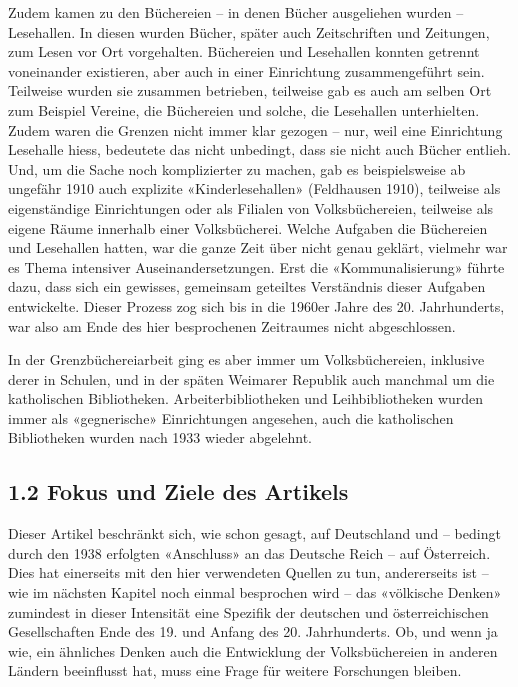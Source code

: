 \documentclass[a4paper,
fontsize=11pt,
oneside,
numbers=noperiodatend,
parskip=half-,
bibliography=totoc,
final
]{scrartcl}
\begin{document}
Zudem kamen zu den Büchereien -- in denen Bücher ausgeliehen wurden --
Lesehallen. In diesen wurden Bücher, später auch Zeitschriften und
Zeitungen, zum Lesen vor Ort vorgehalten. Büchereien und Lesehallen
konnten getrennt voneinander existieren, aber auch in einer Einrichtung
zusammengeführt sein. Teilweise wurden sie zusammen betrieben, teilweise
gab es auch am selben Ort zum Beispiel Vereine, die Büchereien und
solche, die Lesehallen unterhielten. Zudem waren die Grenzen nicht immer
klar gezogen -- nur, weil eine Einrichtung Lesehalle hiess, bedeutete
das nicht unbedingt, dass sie nicht auch Bücher entlieh. Und, um die
Sache noch komplizierter zu machen, gab es beispielsweise ab ungefähr
1910 auch explizite «Kinderlesehallen» (Feldhausen 1910), teilweise als
eigenständige Einrichtungen oder als Filialen von Volksbüchereien,
teilweise als eigene Räume innerhalb einer Volksbücherei. Welche
Aufgaben die Büchereien und Lesehallen hatten, war die ganze Zeit über
nicht genau geklärt, vielmehr war es Thema intensiver
Auseinandersetzungen. Erst die «Kommunalisierung» führte dazu, dass sich
ein gewisses, gemeinsam geteiltes Verständnis dieser Aufgaben
entwickelte. Dieser Prozess zog sich bis in die 1960er Jahre des 20.
Jahrhunderts, war also am Ende des hier besprochenen Zeitraumes nicht
abgeschlossen.

In der Grenzbüchereiarbeit ging es aber immer um Volksbüchereien,
inklusive derer in Schulen, und in der späten Weimarer Republik auch
manchmal um die katholischen Bibliotheken. Arbeiterbibliotheken und
Leihbibliotheken wurden immer als «gegnerische» Einrichtungen angesehen,
auch die katholischen Bibliotheken wurden nach 1933 wieder abgelehnt.

\hypertarget{fokus-und-ziele-des-artikels}{%
\subsection{1.2 Fokus und Ziele des
Artikels}\label{fokus-und-ziele-des-artikels}}

Dieser Artikel beschränkt sich, wie schon gesagt, auf Deutschland und --
bedingt durch den 1938 erfolgten «Anschluss» an das Deutsche Reich --
auf Österreich. Dies hat einerseits mit den hier verwendeten Quellen zu
tun, andererseits ist -- wie im nächsten Kapitel noch einmal besprochen
wird -- das «völkische Denken» zumindest in dieser Intensität eine
Spezifik der deutschen und österreichischen Gesellschaften Ende des 19.
und Anfang des 20. Jahrhunderts. Ob, und wenn ja wie, ein ähnliches
Denken auch die Entwicklung der Volksbüchereien in anderen Ländern
beeinflusst hat, muss eine Frage für weitere Forschungen bleiben.
\end{document}
